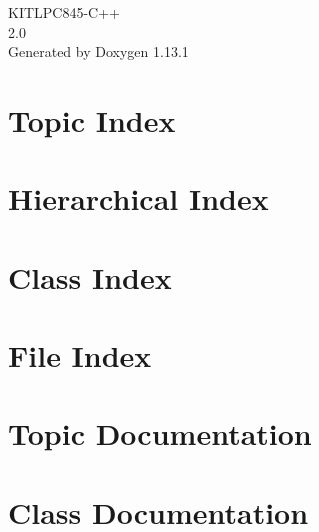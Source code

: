 \documentclass[twoside]{book}
\newcommand{\+}{\discretionary{\mbox{\scriptsize$\hookleftarrow$}}{}{}}
\newcommand{\clearemptydoublepage}{%
    \newpage{\pagestyle{empty}\cleardoublepage}%
  }
\begin{document}
  \raggedbottom
    \hypersetup{pageanchor=false,
                bookmarksnumbered=true,
                pdfencoding=unicode
               }
  \begin{titlepage}
  \vspace*{7cm}
  \begin{center}%
  {\Large KITLPC845-\/\+C++}\\
  [1ex]\large 2.\+0 \\
  \vspace*{1cm}
  {\large Generated by Doxygen 1.13.1}\\
  \end{center}
  \end{titlepage}
  \clearemptydoublepage
  \tableofcontents
  \clearemptydoublepage
  \hypersetup{pageanchor=true}
\chapter{Topic Index}

\chapter{Hierarchical Index}

\chapter{Class Index}

\chapter{File Index}

\chapter{Topic Documentation}


\chapter{Class Documentation}






































\end{document}
